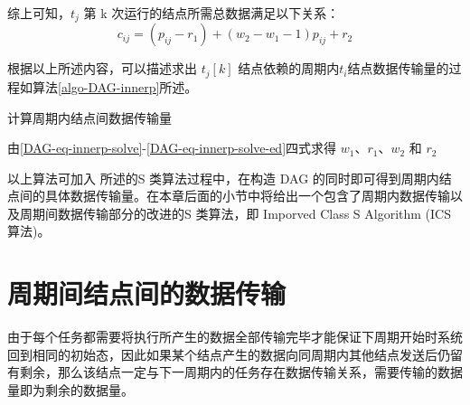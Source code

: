 综上可知，$t_j$ 第 k 次运行的结点所需总数据满足以下关系：
\begin{equation}
  c_{ij}=(p_{ij}-r_1)+(w_2-w_1-1)p_{ij}+r_2
\end{equation}

根据以上所述内容，可以描述求出 $t_j[k]$ 结点依赖的周期内$t_i$结点数据传输量的过程如算法\ref{algo-DAG-innerp}所述。%
\begin{algorithm}
  \caption{计算周期内结点间数据传输量}
  \label{algo-DAG-innerp}
  由\eqref{DAG-eq-innerp-solve}-\eqref{DAG-eq-innerp-solve-ed}四式求得 $w_1$、$r_1$、$w_2$ 和 $r_2$\;
\end{algorithm}


以上算法可加入 \cite{SDF1987} 所述的S 类算法过程中，在构造 DAG 的同时即可得到周期内结点间的具体数据传输量。在本章后面的小节中将给出一个包含了周期内数据传输以及周期间数据传输部分的改进的S 类算法，即 Imporved Class S Algorithm (ICS 算法)。



\section{周期间结点间的数据传输}
\label{DAG-interp}

由于每个任务都需要将执行所产生的数据全部传输完毕才能保证下周期开始时系统回到相同的初始态，因此如果某个结点产生的数据向同周期内其他结点发送后仍留有剩余，那么该结点一定与下一周期内的任务存在数据传输关系，需要传输的数据量即为剩余的数据量。

